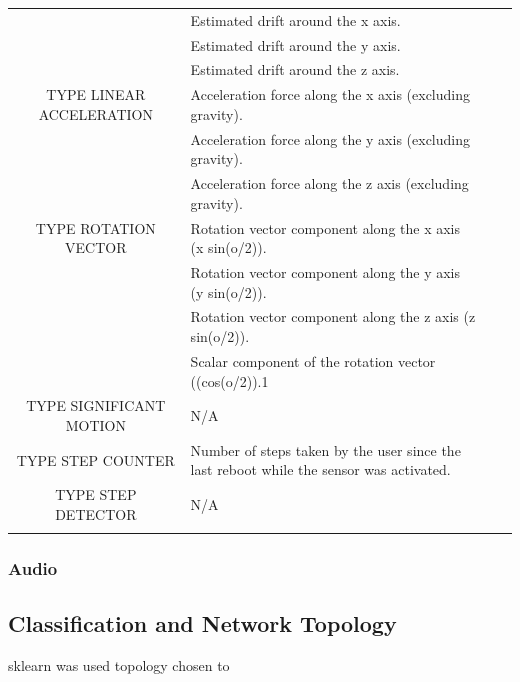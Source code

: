 \documentclass{UoNMCHA}
\numberwithin{equation}{section}
\begin{document}
\begin{table}[h!]
\begin{center}
{\begin{tabular}{c l l l|}
                  & Estimated drift around the x axis. \\
                  & Estimated drift around the y axis. \\
                  & Estimated drift around the z axis. \\
                TYPE LINEAR ACCELERATION & Acceleration force along the x axis (excluding gravity). \\
                  & Acceleration force along the y axis (excluding gravity). \\
                  & Acceleration force along the z axis (excluding gravity). \\
                TYPE ROTATION VECTOR & Rotation vector component along the x axis (x  sin(o/2)). \\
                  & Rotation vector component along the y axis (y  sin(o/2)). \\
                  & Rotation vector component along the z axis (z  sin(o/2)). \\
                  & Scalar component of the rotation vector ((cos(o/2)).1 \\
                TYPE SIGNIFICANT MOTION & N/A \\
                TYPE STEP COUNTER & Number of steps taken by the user since the last reboot while the sensor was activated. \\
                TYPE STEP DETECTOR & N/A \\
                \\ \hline
            \end{tabular}
        }
    \end{center}
\end{table}

\subsubsection{Audio}

\subsection{Classification and Network Topology}
sklearn was used
topology chosen to 
\end{document}
